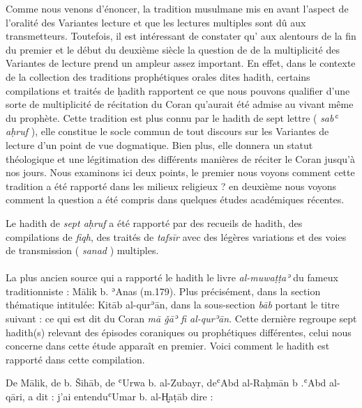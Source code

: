 \documentclass[a4paper,12pt]{report}
\begin{document}
\begin{itemize}
Comme nous venons d’énoncer, la tradition musulmane mis en avant l'aspect de l’oralité des Variantes  lecture et que les lectures multiples sont dû  aux transmetteurs. Toutefois, il est intéressant de constater qu' aux alentours de la fin du premier et le début du deuxième siècle la question de de la multiplicité des Variantes de lecture prend un ampleur assez  important. En effet,  dans le contexte de la collection des traditions prophétiques orales dites hadith, certains compilations et traités de ḥadith rapportent ce que nous pouvons qualifier  d’une sorte de multiplicité de récitation du Coran qu’aurait été admise au vivant même du prophète. Cette tradition est plus connu par le hadith de sept lettre ( \textit{sabʿ aḥruf} ), elle constitue le socle commun de tout discours sur les Variantes de lecture d'un point de vue dogmatique. Bien plus, elle donnera un statut théologique  et une légitimation des différents manières de réciter le Coran jusqu'à nos jours. Nous examinons ici  deux points, le premier nous voyons comment cette tradition a été rapporté dans les milieux religieux ? en deuxième nous voyons comment la question a été compris dans quelques études  académiques  récentes.     


Le hadith de \textit{sept aḥruf}  a été rapporté  par des recueils de hadith, des compilations de \textit{fiqh}, des traités de \textit{tafsīr} avec des légères variations et des voies de transmission ( \textit{sanad} )  multiples.
\paragraph{}
La plus ancien source qui a rapporté le hadith  le  livre \textit{ al-muwaṭṭaʾ} du fameux traditionniste  :  Mālik b. ʾAnas (m.179).  Plus précisément, dans la section thématique intitulée:  Kitāb al-qurʾān, 
dans la sous-section \textit{bāb} portant le titre suivant : ce qui est dit du Coran \textit{mā ǧāʾ fi al-qurʾān}. Cette dernière regroupe sept hadith(s) relevant des épisodes coraniques ou prophétiques différentes, celui nous concerne dans cette étude apparaît en premier. Voici comment le hadith est rapporté dans cette compilation. 


De Mālik, de b. Šihāb, de ʿUrwa b. al-Zubayr, deʿAbd al-Raḥmān b .ʿAbd al-qāri, a dit : 
 j’ai entenduʿUmar b. al-H̬aṭāb dire : 



\end{itemize}
\end{document}
